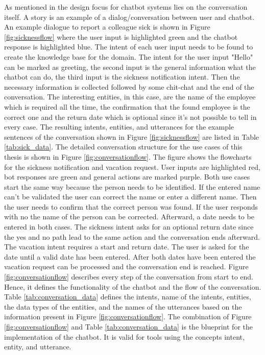  As mentioned in \citet{folstad2017chatbots} the design focus for chatbot systems lies on the conversation itself.
 A story is an example of a dialog/conversation between user and chatbot. 
 An example dialogue to report a colleague sick is shown in Figure \ref{fig:sicknessflow} 
 where the user input is highlighted green and the chatbot response is highlighted blue.
 The intent of each user input needs to be found to create the knowledge base for the domain. 
 The intent for the user input "Hello" can be marked as greeting, the second input is the general information what the chatbot can do, 
 the third input is the sickness notification intent. Then the necessary information is collected followed by some chit-chat and the end of the conversation. 
 The interesting entities, in this case, are the name of the employee which is required all the time, the confirmation that the found employee is the 
 correct one and the return date which is optional since it's not possible to tell in every case. 
 The resulting intents, entities, and utterances for the example sentences of the conversation 
 shown in Figure \ref{fig:sicknessflow} are listed in Table \ref{tab:sick_data}.
 The detailed conversation structure for the use cases of this thesis is shown in 
 Figure \ref{fig:conversationflow}. 
 The figure shows the flowcharts for the sickness notification and 
vacation request.
 User inputs are highlighted red, bot responses are green and general actions are marked purple.
 Both use cases start the same way because the person needs to be identified.
 If the entered name can't be validated the user can correct the name or enter a different name.
 Then the user needs to confirm that the correct person was found.
 If the user responds with no the name of the person can be corrected.
 Afterward, a date needs to be entered in both cases. 
 The sickness intent asks for an optional return date since the yes and no path lead to the same action 
 and the conversation ends afterward.
 The vacation intent requires a start and return date.
 The user is asked for the date until a valid date has been entered.
 After both dates have been entered the vacation request can be processed and the conversation end is reached.
 Figure \ref{fig:conversationflow} describes every step of the conversation from start to end.
 Hence, it defines the functionality of the chatbot and the flow of the conversation.
 Table \ref{tab:conversation_data} defines the intents, name of the intents, entities, the data types of the entities,
 and the names of the utterances based on the information present in Figure \ref{fig:conversationflow}.
 The combination of Figure \ref{fig:conversationflow} and Table \ref{tab:conversation_data} is the 
 blueprint for the implementation of the chatbot.
 It is valid for tools using the concepts intent, entity, and utterance.
 
